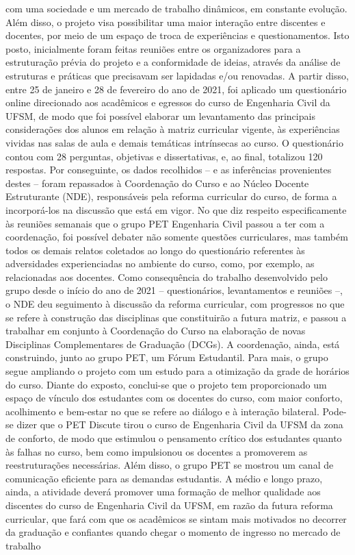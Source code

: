 com uma sociedade e um mercado de trabalho dinâmicos, em constante evolução. Além disso, o 
projeto visa possibilitar uma maior interação entre discentes e docentes, por meio de um espaço 
de troca de experiências e questionamentos. Isto posto, inicialmente foram feitas reuniões entre os 
organizadores para a estruturação prévia do projeto e a conformidade de ideias, através da análise 
de estruturas e práticas que precisavam ser lapidadas e/ou renovadas. A partir disso, entre 25 de 
janeiro e 28 de fevereiro do ano de 2021, foi aplicado um questionário online direcionado aos 
acadêmicos e egressos do curso de Engenharia Civil da UFSM, de modo que foi possível elaborar 
um levantamento das principais considerações dos alunos em relação à matriz curricular vigente, 
às experiências vividas nas salas de aula e demais temáticas intrínsecas ao curso. O questionário 
contou com 28 perguntas, objetivas e dissertativas, e, ao final, totalizou 120 respostas. Por 
conseguinte, os dados recolhidos – e as inferências provenientes destes – foram repassados à 
Coordenação do Curso e ao Núcleo Docente Estruturante (NDE), responsáveis pela reforma 
curricular do curso, de forma a incorporá-los na discussão que está em vigor. No que diz respeito 
especificamente às reuniões semanais que o grupo PET Engenharia Civil passou a ter com a 
coordenação, foi possível debater não somente questões curriculares, mas também todos os demais 
relatos coletados ao longo do questionário referentes às adversidades experienciadas no ambiente 
do curso, como, por exemplo, as relacionadas aos docentes. Como consequência do trabalho 
desenvolvido pelo grupo desde o início do ano de 2021 – questionários, levantamentos e reuniões 
–, o NDE deu seguimento à discussão da reforma curricular, com progressos no que se refere à 
construção das disciplinas que constituirão a futura matriz, e passou a trabalhar em conjunto à 
Coordenação do Curso na elaboração de novas Disciplinas Complementares de Graduação 
(DCGs). A coordenação, ainda, está construindo, junto ao grupo PET, um Fórum Estudantil. Para 
mais, o grupo segue ampliando o projeto com um estudo para a otimização da grade de horários 
do curso. Diante do exposto, conclui-se que o projeto tem proporcionado um espaço de vínculo 
dos estudantes com os docentes do curso, com maior conforto, acolhimento e bem-estar no que se 
refere ao diálogo e à interação bilateral. Pode-se dizer que o PET Discute tirou o curso de 
Engenharia Civil da UFSM da zona de conforto, de modo que estimulou o pensamento crítico dos 
estudantes quanto às falhas no curso, bem como impulsionou os docentes a promoverem as 
reestruturações necessárias. Além disso, o grupo PET se mostrou um canal de comunicação 
eficiente para as demandas estudantis. A médio e longo prazo, ainda, a atividade deverá promover 
uma formação de melhor qualidade aos discentes do curso de Engenharia Civil da UFSM, em 
razão da futura reforma curricular, que fará com que os acadêmicos se sintam mais motivados no 
decorrer da graduação e confiantes quando chegar o momento de ingresso no mercado de trabalho

